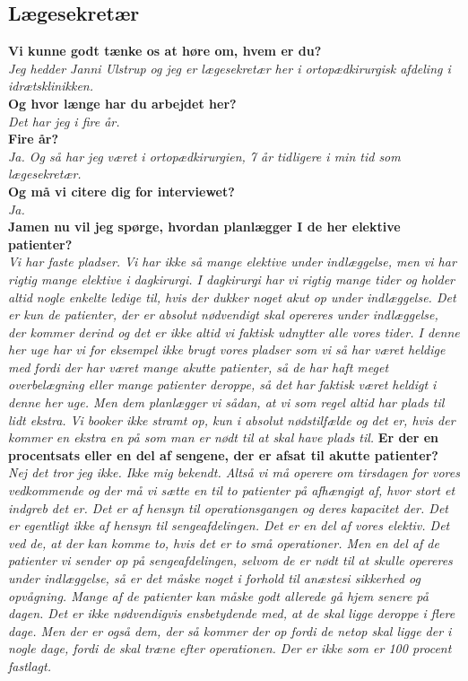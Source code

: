 \subsection{Lægesekretær} \label{bilagsek}
\textbf{Vi kunne godt tænke os at høre om, hvem er du?}\\
\noindent
\textit{Jeg hedder Janni Ulstrup og jeg er lægesekretær her i ortopædkirurgisk afdeling i idrætsklinikken.} \\
\noindent
\textbf{Og hvor længe har du arbejdet her?} \\
\noindent
\textit{Det har jeg i fire år.} \\
\noindent
\textbf{Fire år?} \\
\noindent
\textit{Ja. Og så har jeg været i ortopædkirurgien, 7 år tidligere i min tid som lægesekretær.} \\
\noindent
\textbf{Og må vi citere dig for interviewet?}\\
\noindent
\textit{Ja.} \\
\noindent
\textbf{Jamen nu vil jeg spørge, hvordan planlægger I de her elektive patienter?}\\
\noindent
\textit{Vi har faste pladser. Vi har ikke så mange elektive under indlæggelse, men vi har rigtig mange elektive i dagkirurgi. I dagkirurgi har vi rigtig mange tider og  holder altid nogle enkelte ledige til, hvis der dukker noget akut op under indlæggelse. Det er kun de patienter, der er absolut nødvendigt skal opereres under indlæggelse, der kommer derind og det er ikke altid vi faktisk udnytter alle vores tider. I denne her uge har vi for eksempel ikke brugt vores pladser som vi så har været heldige med fordi der har været mange akutte patienter, så de har haft meget overbelægning eller mange patienter deroppe, så det har faktisk været heldigt i denne her uge. Men dem planlægger vi sådan, at vi som regel altid har plads til lidt ekstra. Vi booker ikke stramt op, kun i absolut nødstilfælde og det er, hvis der kommer en ekstra en på som man er nødt til at skal have plads til.}
\textbf{Er der en procentsats eller en del af sengene, der er afsat til akutte patienter?}\\
\noindent
\textit{Nej det tror jeg ikke. Ikke mig bekendt. Altså vi må operere om tirsdagen for vores vedkommende og der må vi sætte en til to patienter på afhængigt af, hvor stort et indgreb det er. Det er af hensyn til operationsgangen og deres kapacitet der. Det er egentligt ikke af hensyn til sengeafdelingen. Det er en del af vores elektiv. Det ved de, at der kan komme to, hvis det er to små operationer. Men en del af de patienter vi sender op på sengeafdelingen, selvom de er nødt til at skulle opereres under indlæggelse, så er det måske noget i forhold til anæstesi sikkerhed og opvågning. Mange af de patienter kan måske godt allerede gå hjem senere på dagen. Det er ikke nødvendigvis ensbetydende med, at de skal ligge deroppe i flere dage. Men der er også dem, der så kommer der op fordi de netop skal ligge der i nogle dage, fordi de skal træne efter operationen. Der er ikke som er 100 procent fastlagt.} 
